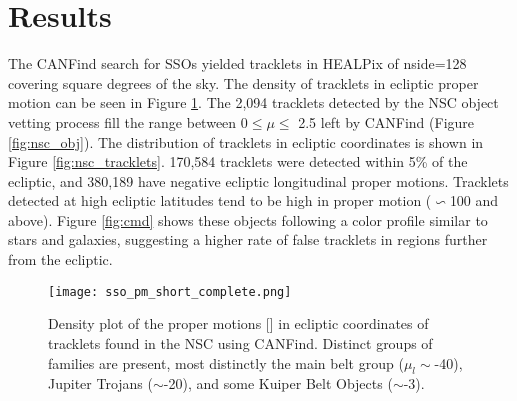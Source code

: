 \documentclass[twocolumn]{aastex62}
\begin{document}


\section{Results}
\label{sec:results}

The CANFind search for SSOs yielded  tracklets in  HEALPix of nside=128 covering  square degrees of the sky.  The density of tracklets in ecliptic proper motion can be seen in Figure \ref{fig:proper_motion}.  The 2,094 tracklets detected by the NSC object vetting process fill the range between 0$\leq\mu\leq$ 2.5\arh \editoneb{(0.017\ded)} left by CANFind (Figure \ref{fig:nsc_obj}).  The distribution of tracklets in ecliptic coordinates is shown in Figure \ref{fig:nsc_tracklets}.  170,584 tracklets were detected within 5\% of the ecliptic, and 380,189 have negative ecliptic longitudinal proper motions.  Tracklets detected at high ecliptic latitudes tend to be high in proper motion ($\backsim$100\arh{} and above).  Figure \ref{fig:cmd} shows these objects following a color profile similar to stars and galaxies, suggesting a higher rate of false tracklets in regions further from the ecliptic. 

\begin{figure}[t]
\centering
\texttt{[image: sso\_pm\_short\_complete.png]}
\caption{Density plot of the proper motions [\arh] in ecliptic coordinates of tracklets found in the NSC using CANFind.  Distinct groups of families are present, most distinctly the main belt group ($\mu_{l}\sim$-40\arh {}), Jupiter Trojans ($\sim$-20\arh {}), and some Kuiper Belt Objects ($\sim$-3\arh {}).}
\label{fig:proper_motion}
\end{figure}
\end{document}
